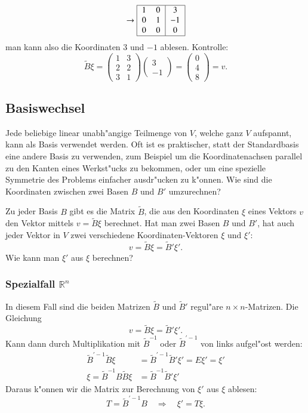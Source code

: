 \begin{beispiel}
\[\rightarrow
\begin{tabular}{|>{$}c<{$}>{$}c<{$}|>{$}c<{$}|}
\hline
1&0&3\\
0&1&-1\\
0&0&0\\
\hline
\end{tabular}
\]
man kann also die Koordinaten $3$ und $-1$ ablesen.
Kontrolle:
\[
\tilde B\xi
=
\begin{pmatrix}
1&3\\
2&2\\
3&1\end{pmatrix}
\begin{pmatrix}3\\-1\end{pmatrix}
=\begin{pmatrix}
0\\4\\8
\end{pmatrix}
=v.
\]
\end{beispiel}

\subsection{Basiswechsel}
Jede beliebige linear unabh"angige Teilmenge von $V$, welche ganz $V$
aufspannt, kann als Basis verwendet werden.
Oft ist es praktischer,
statt der Standardbasis eine andere Basis zu verwenden, zum Beispiel
um die Koordinatenachsen parallel zu den Kanten eines Werkst"ucks zu
bekommen, oder um eine spezielle Symmetrie des Problems einfacher
ausdr"ucken zu k"onnen.
Wie sind die Koordinaten zwischen zwei Basen $B$ und $B'$ umzurechnen?

Zu jeder Basis $B$ gibt es die Matrix $\tilde B$, die aus den
Koordinaten $\xi$ eines Vektors $v$ den Vektor mittels $v=\tilde B\xi$
berechnet.
Hat man zwei Basen $B$ und $B'$, hat auch jeder Vektor
in $V$ zwei verschiedene Koordinaten-Vektoren $\xi$ und $\xi'$:
\[
v=\tilde B\xi =\tilde B'\xi'.
\]
Wie kann man $\xi'$ aus $\xi$ berechnen?

\subsubsection{Spezialfall $\mathbb R^n$}
In diesem Fall sind die beiden Matrizen $\tilde B$ und $\tilde B'$
regul"are $n\times n$-Matrizen.
Die Gleichung
\[
v=\tilde B\xi =\tilde B'\xi'.
\]
Kann dann durch Multiplikation mit $\tilde B^{-1}$ oder $\tilde B^{\prime-1}$
von links aufgel"ost werden:
\begin{align*}
\tilde B^{\prime-1}\tilde B\xi&= \tilde B^{\prime -1}\tilde B'\xi'=E\xi'=\xi'\\
\xi=\tilde B^{-1}B\tilde B\xi&=\tilde B^{-1}\tilde B'\xi'
\end{align*}
Daraus k"onnen wir die Matrix zur Berechnung von $\xi'$ aus $\xi$
ablesen: 
\[
T=\tilde B^{\prime-1}B \quad\Rightarrow\quad
\xi'=T\xi.
\]

